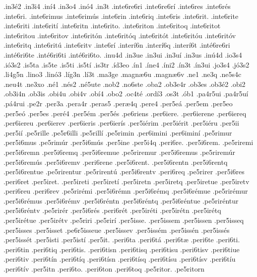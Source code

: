 {.in3^^e92
.in3i4
.in^^ed4
.in3o4
.in^^f34
.in3t
.inte6re6ri
.inte6re6r^^ed
.inte6res
.inte6r^^e9s
.inte6ri.
.inte6rimus
.inte6rim^^fas
.inte6rin
.inte6riq
.inte6ris
.inte6rit.
.inte6rite
.inte6riti
.inte6rit^^ed
.inte6ritn
.inte6rito.
.inte6riton
.inte6ritoq
.inte6ritot
.inte6ritou
.inte6ritov
.inte6rit^^f3n
.inte6rit^^f3q
.inte6rit^^f3t
.inte6rit^^f3u
.inte6rit^^f3v
.inte6ritq
.inte6rit^^fa
.inte6ritv
.inte6r^^ed
.inter^^ed6n
.inter^^ed6q
.inter^^ed6t
.int^^e96re6ri
.int^^e96ri6te
.int^^e96ri6ti
.int^^e96ri6to.
.inu4d
.in3ue
.in3ui
.in3u^^ed
.in3us
.in^^fa4d
.io3s4
.i^^f33s2
.is5ta
.is5te
.is5ti
.is5t^^ed
.is3tr
.^^edd3eo
.^^edn1
.^^edne4
.^^edni2
.^^edn3t
.^^edn3ui
.jo3s4
.j^^f33s2
.li4g5n
.lino3
.lin^^f33
.l^^edg3n
.l^^ed3t
.ma3ge
.magn^^e66u
.magn^^e66v
.ne1
.ne3q
.ne5s4c
.neu4t
.ne3xo
.n^^e91
.n^^e9s2
.n^^e95ute
.nob2
.no6ste
.oba2
.ob3e4r
.ob3es
.ob3^^e92
.obi2
.ob3i4n
.ob3is
.obi4u
.obi4v
.ob^^ed4
.obo2
.oc4t^^e9
.ord^^ed3
.os3t
.^^f3b1
.pa4r5ui
.pa4r5u^^ed
.p^^e14rui
.pe2r
.per3a
.pera4r
.peras5
.per^^e64q
.pere4
.per5e^^e1
.per5em
.per5eo
.per5e^^f3
.per5es
.per^^e94
.per5^^e9m
.per5^^e9s
.pe6riens
.per6iere.
.per6ierene
.per6iereq
.per6iereu
.per6ierev
.per6ieris
.per6ier^^eds
.per5i^^e9rim
.per5i^^e9rit
.per5i^^e9ru
.per5ii
.per5i^^ed
.pe5rille
.pe5r6illi
.pe5rill^^ed
.pe5rimin
.per6imini
.per6imin^^ed
.pe5rimur
.per5i6mus
.pe5rim^^far
.per5i6m^^fas
.per5ine
.per5i4q
.peri6re.
.per5i6rem.
.pe5riremi
.per5i6remn
.per5i6remq
.per5i6remue
.pe5riremur
.per5i6remus
.pe5rirem^^far
.per5i6rem^^fas
.per5i6remv
.peri6rene
.per5i6rent.
.per5i6rentn
.per5i6rentq
.per5i6rentue
.pe5rirentur
.pe5rirent^^fa
.per5i6rentv
.peri6req
.pe5rirer
.per5i6res
.peri6ret
.per5iret.
.per5ireti
.per5iret^^ed
.per5iretn
.per5iretq
.per5iretue
.per5iretv
.peri6reu
.peri6rev
.pe5rir^^e9mi
.per5i6r^^e9mn
.per5i6r^^e9mq
.per5i6r^^e9mue
.pe5rir^^e9mur
.per5i6r^^e9mus
.per5i6r^^e9mv
.per5i6r^^e9ntn
.per5i6r^^e9ntq
.per5i6r^^e9ntue
.pe5rir^^e9ntur
.per5i6r^^e9ntv
.pe5rir^^e9r
.per5i6r^^e9s
.peri6r^^e9t
.per5ir^^e9ti
.per5ir^^e9tn
.per5ir^^e9tq
.per5ir^^e9tue
.per5ir^^e9tv
.pe5riri
.pe5rir^^ed
.per5isse.
.per5issem
.per5issen
.per5isseq
.per5isses
.per5isset
.pe6r5isseue
.per5issev
.per5iss^^e9m
.per5iss^^e9n
.per5iss^^e9s
.per5iss^^e9t
.per5isti
.per5ist^^ed
.per5it.
.peri6ta
.peri6t^^e1
.peri6t^^e6
.peri6te
.peri6ti.
.peri6tin
.peri6tiq
.peri6tis.
.peri6tisn
.peri6tisq
.peri6tisu
.peri6tisv
.peri6tiue
.peri6tiv
.peri6t^^edn
.peri6t^^edq
.peri6t^^edsn
.peri6t^^edsq
.peri6t^^edsu
.peri6t^^edsv
.peri6t^^edu
.peri6t^^edv
.per5itn
.peri6to.
.peri6ton
.peri6toq
.pe5ritor.
.pe5ritorn
}

